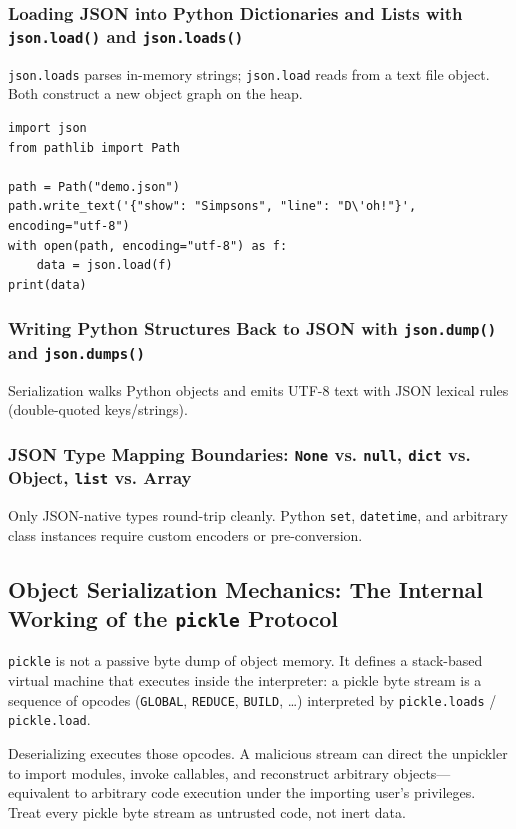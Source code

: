 \documentclass[a4paper,twoside]{report}
\begin{document}
\subsubsection{Loading JSON into Python Dictionaries and Lists with \texttt{json.load()} and \texttt{json.loads()}}

\texttt{json.loads} parses in-memory strings; \texttt{json.load} reads from a text file object. Both construct a new object graph on the heap.

\begin{verbatim}
import json
from pathlib import Path

path = Path("demo.json")
path.write_text('{"show": "Simpsons", "line": "D\'oh!"}', encoding="utf-8")
with open(path, encoding="utf-8") as f:
    data = json.load(f)
print(data)
\end{verbatim}

\subsubsection{Writing Python Structures Back to JSON with \texttt{json.dump()} and \texttt{json.dumps()}}

Serialization walks Python objects and emits UTF-8 text with JSON lexical rules (double-quoted keys/strings).

\subsubsection{JSON Type Mapping Boundaries: \texttt{None} vs. \texttt{null}, \texttt{dict} vs. Object, \texttt{list} vs. Array}

Only JSON-native types round-trip cleanly. Python \texttt{set}, \texttt{datetime}, and arbitrary class instances require custom encoders or pre-conversion.


\subsection{Object Serialization Mechanics: The Internal Working of the \texttt{pickle} Protocol}

\texttt{pickle} is not a passive byte dump of object memory. It defines a stack-based virtual machine that executes inside the interpreter: a pickle byte stream is a sequence of opcodes (\texttt{GLOBAL}, \texttt{REDUCE}, \texttt{BUILD}, \ldots) interpreted by \texttt{pickle.loads} / \texttt{pickle.load}.

Deserializing executes those opcodes. A malicious stream can direct the unpickler to import modules, invoke callables, and reconstruct arbitrary objects---equivalent to arbitrary code execution under the importing user's privileges. Treat every pickle byte stream as untrusted code, not inert data.
\end{document}
